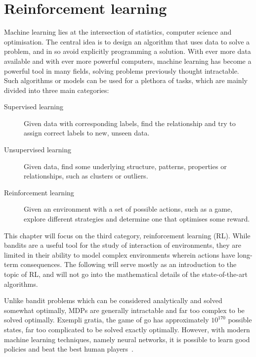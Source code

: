 \chapter{Reinforcement learning}
\label{chap:rl}

Machine learning lies at the intersection of statistics, computer science and optimisation.
The central idea is to design an algorithm that uses data to solve a problem, and in so avoid explicitly programming a solution.
With ever more data available and with ever more powerful computers, machine learning has become a powerful tool in many fields, solving problems previously thought intractable.
Such algorithms or models can be used for a plethora of tasks, which are mainly divided into three main categories:
\begin{description}

    \item[Supervised learning]
        Given data with corresponding labels, find the relationship and try to assign correct labels to new, unseen data.

    \item[Unsupervised learning]
        Given data, find some underlying structure, patterns, properties or relationships, such as clusters or outliers.

    \item[Reinforcement learning]
        Given an environment with a set of possible actions, such as a game, explore different strategies and determine one that optimises some reward.

\end{description}

This chapter will focus on the third category, reinforcement learning (RL).
While bandits are a useful tool for the study of interaction of environments, they are limited in their ability to model complex environments wherein actions have long-term consequences.
The following will serve mostly as an introduction to the topic of RL, and will not go into the mathematical details of the state-of-the-art algorithms.

Unlike bandit problems which can be considered analytically and solved somewhat optimally, MDPs are generally intractable and far too complex to be solved optimally.
Exempli gratia, the game of go has approximately $10^{170}$ possible states, far too complicated to be solved exactly optimally.
However, with modern machine learning techniques, namely neural networks, it is possible to learn good policies and beat the best human players~\autocite{silver2016}.

